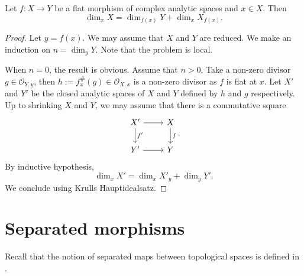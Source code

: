 \begin{proposition}\label{prop-flatmorphismdimformula}
    Let $f:X\rightarrow Y$ be a flat morphism of complex analytic spaces and $x\in X$. Then
    \[
        \dim_x X=\dim_{f(x)} Y+\dim_x X_{f(x)}.  
    \]
\end{proposition}
\begin{proof}
    Let $y=f(x)$. We may assume that $X$ and $Y$ are reduced. We make an induction on $n=\dim_y Y$. Note that the problem is local.

    When $n=0$, the result is obvious. Assume that $n>0$. Take a non-zero divisor $g\in \mathcal{O}_{Y,y}$, then $h:=f_x^{\#}(g)\in \mathcal{O}_{X,x}$ is a non-zero divisor as $f$ is flat at $x$. Let $X'$ and $Y'$ be the closed analytic spaces of $X$ and $Y$ defined by $h$ and $g$ respectively. Up to shrinking $X$ and $Y$, we may assume that there is a commutative square
    \[
        \begin{tikzcd}
            X' \arrow[r] \arrow[d, "f'"] & X \arrow[d, "f"] \\
            Y' \arrow[r]                 & Y               
        \end{tikzcd}.  
    \]
    By inductive hypothesis, 
    \[
        \dim_x X'=\dim_x X'_y+\dim_y Y'.  
    \]
    We conclude using Krulls Hauptidealsatz.
\end{proof}


\section{Separated morphisms}

Recall that the notion of separated maps between topological spaces is defined in \cite[\href{https://stacks.math.columbia.edu/tag/0CY1}{Tag 0CY1}]{stacks-project}.

